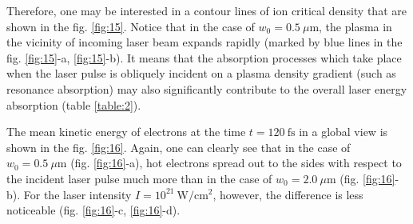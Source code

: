 Therefore, one may be interested in a contour lines of ion critical density that are shown in the fig. \ref{fig:15}. Notice that in the case of $ w_0 = 0.5 \ \mu\mathrm{m} $, the plasma in the vicinity of incoming laser beam expands rapidly (marked by blue lines in the fig. \ref{fig:15}-a, \ref{fig:15}-b). It means that the absorption processes which take place when the laser pulse is obliquely incident on a plasma density gradient (such as resonance absorption) may also significantly contribute to the overall laser energy absorption (table \ref{table:2}).

The mean kinetic energy of electrons at the time $ t = 120 \ \mathrm{fs} $ in a global view is shown in the fig. \ref{fig:16}. Again, one can clearly see that in the case of $ w_0 = 0.5 \ \mu\mathrm{m} $ (fig. \ref{fig:16}-a), hot electrons spread out to the sides with respect to the incident laser pulse much more than in the case of $ w_0 = 2.0 \ \mu\mathrm{m} $ (fig. \ref{fig:16}-b). For the laser intensity $ I = 10^{21} \ \mathrm{W/cm^2} $, however, the difference is less noticeable (fig. \ref{fig:16}-c, \ref{fig:16}-d).

